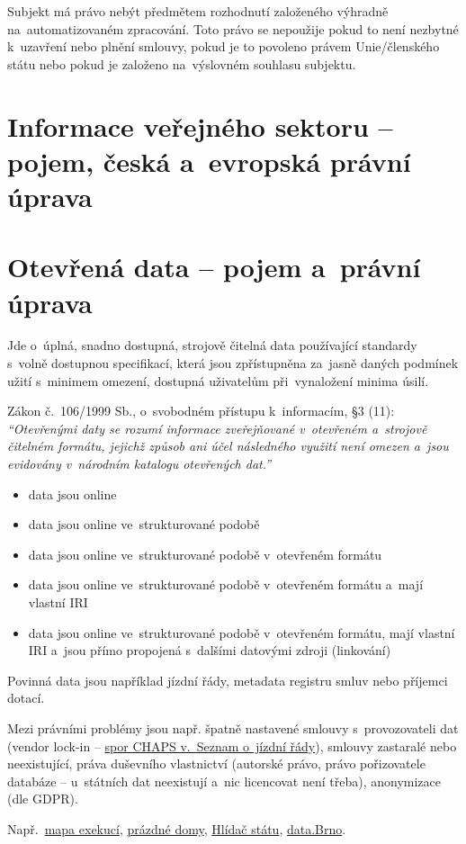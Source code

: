 Subjekt má právo nebýt předmětem rozhodnutí založeného výhradně na~automatizovaném zpracování. Toto právo se nepoužije pokud to není nezbytné k~uzavření nebo plnění smlouvy, pokud je to povoleno právem Unie/členského státu nebo pokud je založeno na~výslovném souhlasu subjektu.

\clearpage
\section{Informace veřejného sektoru -- pojem, česká a~evropská právní úprava}

\clearpage
\section{Otevřená data -- pojem a~právní úprava}

Jde o~úplná, snadno dostupná, strojově čitelná data používající standardy s~volně dostupnou specifikací, která jsou zpřístupněna za~jasně daných podmínek užití s~minimem omezení, dostupná uživatelům při~vynaložení minima úsilí.

Zákon č.~106/1999 Sb., o~svobodném přístupu k~informacím, §3 (11): \emph{\enquote{Otevřenými daty se rozumí informace zveřejňované v~otevřeném a~strojově čitelném formátu, jejichž způsob ani účel následného využití není omezen a~jsou evidovány v~národním katalogu otevřených dat.}}

\begin{itemize}[noitemsep]
\item data jsou online
\item data jsou online ve~strukturované podobě
\item data jsou online ve~strukturované podobě v~otevřeném formátu
\item data jsou online ve~strukturované podobě v~otevřeném formátu a~mají vlastní IRI
\item data jsou online ve~strukturované podobě v~otevřeném formátu, mají vlastní IRI a~jsou přímo propojená s~dalšími datovými zdroji (linkování)
\end{itemize}

Povinná data jsou například jízdní řády, metadata registru smluv nebo příjemci dotací.

Mezi právními problémy jsou např. špatně nastavené smlouvy s~provozovateli dat (vendor lock-in -- \href{http://ictjudikatura.law.muni.cz/wiki/6_As_38/2015_-_51_-_\%C5\%BD\%C3\%A1dost_o_specifick\%C3\%BD_form\%C3\%A1t_informac\%C3\%AD_(CHAPS)}{spor CHAPS v.~Seznam o~jízdní řády}), smlouvy zastaralé nebo neexistující, práva duševního vlastnictví (autorské právo, právo pořizovatele databáze -- u~státních dat neexistují a~nic licencovat není třeba), anonymizace (dle GDPR).

Např.~\href{https://mapaexekuci.cz}{mapa exekucí}, \href{https://prazdnedomy.cz}{prázdné domy}, \href{https://hlidacstatu.cz}{Hlídač státu}, \href{https://data.brno.cz}{data.Brno}.
